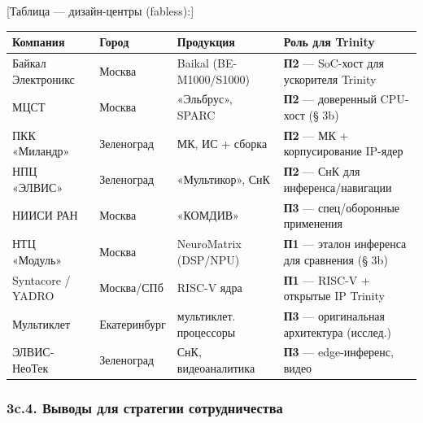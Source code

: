 \documentclass[
  russian,
]{article}
\begin{document}
{[}Таблица --- дизайн-центры (fabless):{]}

\begin{longtable}[]{@{}
  >{\raggedright\arraybackslash}p{}
  >{\raggedright\arraybackslash}p{}
  >{\raggedright\arraybackslash}p{}
  >{\raggedright\arraybackslash}p{}@{}}
\toprule\noalign{}
\begin{minipage}[b]{\linewidth}\raggedright
Компания
\end{minipage} & \begin{minipage}[b]{\linewidth}\raggedright
Город
\end{minipage} & \begin{minipage}[b]{\linewidth}\raggedright
Продукция
\end{minipage} & \begin{minipage}[b]{\linewidth}\raggedright
Роль для Trinity
\end{minipage} \\
\midrule\noalign{}
\endhead
\bottomrule\noalign{}
\endlastfoot
Байкал Электроникс & Москва & Baikal (BE-M1000/S1000) & \textbf{П2} ---
SoC-хост для ускорителя Trinity \\
МЦСТ & Москва & «Эльбрус», SPARC & \textbf{П2} --- доверенный CPU-хост
(§ 3b) \\
ПКК «Миландр» & Зеленоград & МК, ИС + сборка & \textbf{П2} --- МК +
корпусирование IP-ядер \\
НПЦ «ЭЛВИС» & Зеленоград & «Мультикор», СнК & \textbf{П2} --- СнК для
инференса/навигации \\
НИИСИ РАН & Москва & «КОМДИВ» & \textbf{П3} --- спец/оборонные
применения \\
НТЦ «Модуль» & Москва & NeuroMatrix (DSP/NPU) & \textbf{П1} --- эталон
инференса для сравнения (§ 3b) \\
Syntacore / YADRO & Москва/СПб & RISC-V ядра & \textbf{П1} --- RISC-V +
открытые IP Trinity \\
Мультиклет & Екатеринбург & мультиклет. процессоры & \textbf{П3} ---
оригинальная архитектура (исслед.) \\
ЭЛВИС-НеоТек & Зеленоград & СнК, видеоаналитика & \textbf{П3} ---
edge-инференс, видео \\
\end{longtable}

\subsubsection{3c.4. Выводы для стратегии
сотрудничества}\label{c.4.-ux432ux44bux432ux43eux434ux44b-ux434ux43bux44f-ux441ux442ux440ux430ux442ux435ux433ux438ux438-ux441ux43eux442ux440ux443ux434ux43dux438ux447ux435ux441ux442ux432ux430}
\end{document}
